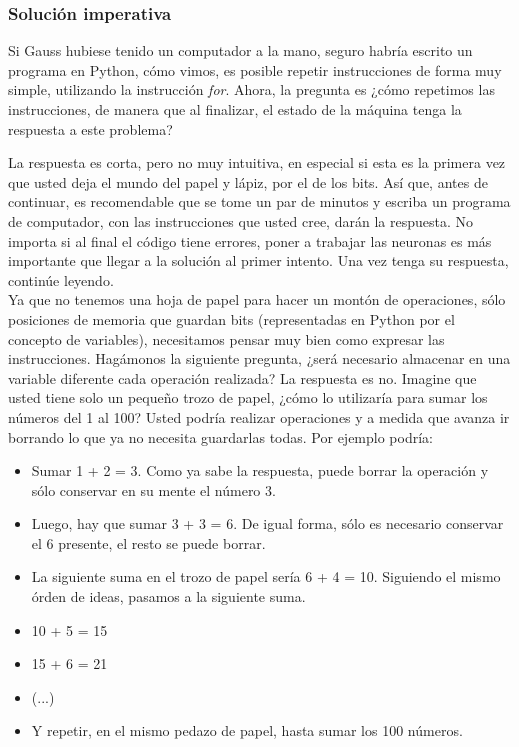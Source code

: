 \subsubsection{Solución imperativa}
Si Gauss hubiese tenido un computador a la mano, seguro habría escrito un programa en Python, cómo vimos, es posible repetir instrucciones de forma muy simple, utilizando la instrucción \emph{for}. Ahora, la pregunta es ¿cómo repetimos las instrucciones, de manera que al finalizar, el estado de la máquina tenga la respuesta a este problema?

La respuesta es corta, pero no muy intuitiva, en especial si esta es la primera vez que usted deja el mundo del papel y lápiz, por el de los bits. Así que, antes de continuar, es recomendable que se tome un par de minutos y escriba un programa de computador, con las instrucciones que usted cree, darán la respuesta. No importa si al final el código tiene errores, poner a trabajar las neuronas es más importante que llegar a la solución al primer intento. Una vez tenga su respuesta, continúe leyendo.
\\

Ya que no tenemos una hoja de papel para hacer un montón de operaciones, sólo posiciones de memoria que guardan bits (representadas en Python por el concepto de variables), necesitamos pensar muy bien como expresar las instrucciones. Hagámonos la siguiente pregunta, ¿será necesario almacenar en una variable diferente cada operación realizada? La respuesta es no. Imagine que usted tiene solo un pequeño trozo de papel, ¿cómo lo utilizaría para sumar los números del 1 al 100? Usted podría realizar operaciones y a medida que avanza ir borrando lo que ya no necesita guardarlas todas. Por ejemplo podría:

\begin{itemize}
\item Sumar 1 + 2 = 3. Como ya sabe la respuesta, puede borrar la operación y sólo conservar en su mente el número 3.
\item Luego, hay que sumar 3 + 3 = 6. De igual forma, sólo es necesario conservar el 6 presente, el resto se puede borrar.
\item La siguiente suma en el trozo de papel sería 6 + 4 = 10. Siguiendo el mismo órden de ideas, pasamos a la siguiente suma.
\item 10 + 5 = 15
\item 15 + 6 = 21
\item (...)
\item Y repetir, en el mismo pedazo de papel, hasta sumar los 100 números. 
\end{itemize}

